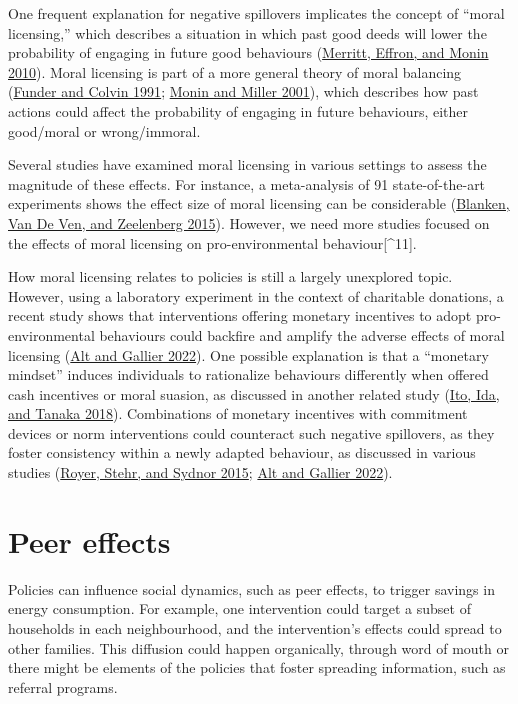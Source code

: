 \documentclass[
  12pt,
  captions=heading]{scrreport}
\begin{document}
One frequent explanation for negative spillovers implicates the concept
of ``moral licensing,'' which describes a situation in which past good
deeds will lower the probability of engaging in future good behaviours
(\protect\hyperlink{ref-merritt2010moral}{Merritt, Effron, and Monin
2010}). Moral licensing is part of a more general theory of moral
balancing (\protect\hyperlink{ref-funder1991explorations}{Funder and
Colvin 1991}; \protect\hyperlink{ref-monin2001moral}{Monin and Miller
2001}), which describes how past actions could affect the probability of
engaging in future behaviours, either good/moral or wrong/immoral.

Several studies have examined moral licensing in various settings to
assess the magnitude of these effects. For instance, a meta-analysis of
91 state-of-the-art experiments shows the effect size of moral licensing
can be considerable (\protect\hyperlink{ref-blanken2015meta}{Blanken,
Van De Ven, and Zeelenberg 2015}). However, we need more studies focused
on the effects of moral licensing on pro-environmental
behaviour{[}\^{}11{]}.

How moral licensing relates to policies is still a largely unexplored
topic. However, using a laboratory experiment in the context of
charitable donations, a recent study shows that interventions offering
monetary incentives to adopt pro-environmental behaviours could backfire
and amplify the adverse effects of moral licensing
(\protect\hyperlink{ref-alt2022incentives}{Alt and Gallier 2022}). One
possible explanation is that a ``monetary mindset'' induces individuals
to rationalize behaviours differently when offered cash incentives or
moral suasion, as discussed in another related study
(\protect\hyperlink{ref-ito2018moral}{Ito, Ida, and Tanaka 2018}).
Combinations of monetary incentives with commitment devices or norm
interventions could counteract such negative spillovers, as they foster
consistency within a newly adapted behaviour, as discussed in various
studies (\protect\hyperlink{ref-royer2015incentives}{Royer, Stehr, and
Sydnor 2015}; \protect\hyperlink{ref-alt2022incentives}{Alt and Gallier
2022}).

\hypertarget{peer-effects}{%
\section{Peer effects}\label{peer-effects}}

Policies can influence social dynamics, such as peer effects, to trigger
savings in energy consumption. For example, one intervention could
target a subset of households in each neighbourhood, and the
intervention's effects could spread to other families. This diffusion
could happen organically, through word of mouth or there might be
elements of the policies that foster spreading information, such as
referral programs.
\end{document}
